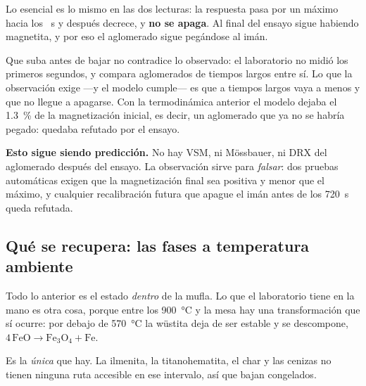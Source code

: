 \documentclass[11pt,a4paper]{article}
\newcommand{\ojo}[1]{\textcolor{aviso}{\textbf{#1}}}
\begin{document}
Lo esencial es lo mismo en las dos lecturas: la respuesta pasa por un máximo
hacia los \datMagnetTMaxima\ \si{\second} y después decrece, y \textbf{no se
apaga}. Al final del ensayo sigue habiendo magnetita, y por eso el aglomerado
sigue pegándose al imán.

Que suba antes de bajar no contradice lo observado: el laboratorio no midió los
primeros segundos, y compara aglomerados de tiempos largos entre sí. Lo que la
observación exige ---y el modelo cumple--- es que a tiempos largos vaya a menos
y que no llegue a apagarse. Con la termodinámica anterior el modelo dejaba el
\qty{1.3}{\percent} de la magnetización inicial, es decir, un aglomerado que ya
no se habría pegado: quedaba refutado por el ensayo.

\ojo{Esto sigue siendo predicción.} No hay VSM, ni Mössbauer, ni DRX del
aglomerado después del ensayo. La observación sirve para \emph{falsar}: dos
pruebas automáticas exigen que la magnetización final sea positiva y menor que
el máximo, y cualquier recalibración futura que apague el imán antes de los
\SI{720}{\second} queda refutada.

\subsection{Qué se recupera: las fases a temperatura ambiente}
\label{sec:enfriado}

Todo lo anterior es el estado \emph{dentro} de la mufla. Lo que el laboratorio
tiene en la mano es otra cosa, porque entre los \SI{900}{\celsius} y la mesa hay
una transformación que sí ocurre: por debajo de \SI{570}{\celsius} la wüstita
deja de ser estable y se descompone,
$4\,\mathrm{FeO} \rightarrow \mathrm{Fe_3O_4} + \mathrm{Fe}$.

Es la \emph{única} que hay. La ilmenita, la titanohematita, el char y las
cenizas no tienen ninguna ruta accesible en ese intervalo, así que bajan
congelados.

\begin{table}[H]
\centering\small

\caption{Composición \textbf{dentro de la mufla} en cada instante de
extracción: \% en masa sobre el sólido, con la masa total y la porosidad. Cada
fila suma 100. A partir de los \SI{150}{\second} no cambia nada más: se agotó el
reductor. Esto es lo que hay \emph{a \SI{900}{\celsius}}; lo que se saca y se
deja enfriar está en el cuadro~\ref{tab:enfriado}.}
\label{tab:fases-tiempo}
\end{table}
\end{document}
